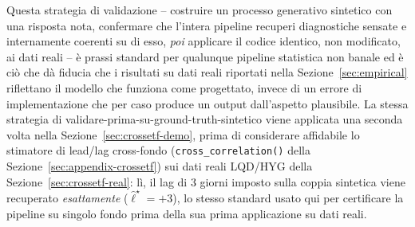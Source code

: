 \documentclass[11pt]{article}
\theoremstyle{definition}
\theoremstyle{remark}
\begin{document}
Questa strategia di validazione -- costruire un processo generativo sintetico con una risposta nota, confermare che l'intera pipeline recuperi diagnostiche sensate e internamente coerenti su di esso, \emph{poi} applicare il codice identico, non modificato, ai dati reali -- \`e prassi standard per qualunque pipeline statistica non banale ed \`e ci\`o che d\`a fiducia che i risultati su dati reali riportati nella Sezione~\ref{sec:empirical} riflettano il modello che funziona come progettato, invece di un errore di implementazione che per caso produce un output dall'aspetto plausibile. La stessa strategia di validare-prima-su-ground-truth-sintetico viene applicata una seconda volta nella Sezione~\ref{sec:crossetf-demo}, prima di considerare affidabile lo stimatore di lead/lag cross-fondo (\texttt{cross\_correlation()} della Sezione~\ref{sec:appendix-crossetf}) sui dati reali LQD/HYG della Sezione~\ref{sec:crossetf-real}: l\`i, il lag di 3 giorni imposto sulla coppia sintetica viene recuperato \emph{esattamente} ($\widehat\ell^\star=+3$), lo stesso standard usato qui per certificare la pipeline su singolo fondo prima della sua prima applicazione su dati reali.
\end{document}
